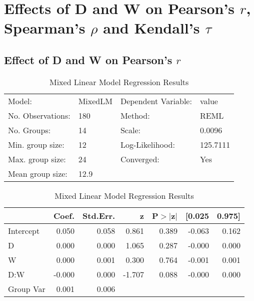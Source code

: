 \documentclass{article}
\begin{document}
\section{Effects of D and W on Pearson's $r$, Spearman's $\rho$ and Kendall's $\tau$}

\subsection{Effect of D and W on Pearson's $r$}

\begin{table}
    \caption{Mixed Linear Model Regression Results}
    \label{}
    \begin{center}
    \begin{tabular}{llll}
    \hline
    Model:            & MixedLM & Dependent Variable: & value     \\
    No. Observations: & 180     & Method:             & REML      \\
    No. Groups:       & 14      & Scale:              & 0.0096    \\
    Min. group size:  & 12      & Log-Likelihood:     & 125.7111  \\
    Max. group size:  & 24      & Converged:          & Yes       \\
    Mean group size:  & 12.9    &                     &           \\
    \hline
    \end{tabular}
    \end{center}
    
    \begin{center}
    \begin{tabular}{lrrrrrr}
    \hline
              &  Coef. & Std.Err. &      z & P$> |$z$|$ & [0.025 & 0.975]  \\
    \hline
    Intercept &  0.050 &    0.058 &  0.861 &       0.389 & -0.063 &  0.162  \\
    D         &  0.000 &    0.000 &  1.065 &       0.287 & -0.000 &  0.000  \\
    W         &  0.000 &    0.001 &  0.300 &       0.764 & -0.001 &  0.001  \\
    D:W       & -0.000 &    0.000 & -1.707 &       0.088 & -0.000 &  0.000  \\
    Group Var &  0.001 &    0.006 &        &             &        &         \\
    \hline
    \end{tabular}
    \end{center}
    \end{table}
\end{document}
